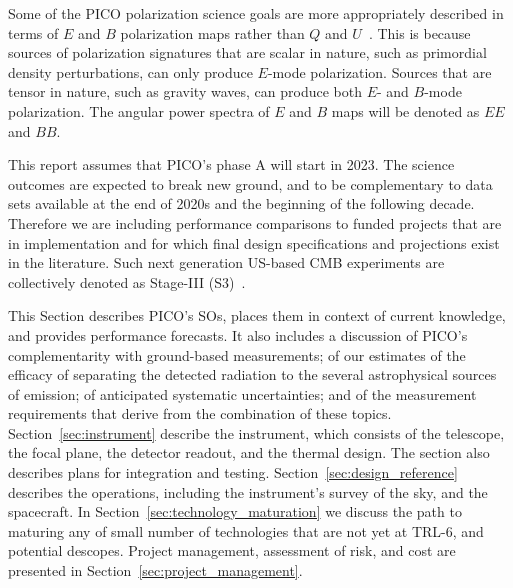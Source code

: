 \documentclass[PICOReport.tex]{subfiles}
\begin{document}

Some of the PICO polarization science goals are more appropriately described in terms of $E$ and $B$ polarization maps rather than $Q$ and $U$~\cite{eb_decomposition}. This is because sources of polarization signatures that are scalar in nature, such as primordial density perturbations, can only produce $E$-mode polarization. Sources that are tensor in nature, such as gravity waves, can produce both $E$- and $B$-mode polarization. The angular power spectra of $E$ and $B$ maps will be denoted as $EE$ and $BB$.

This report assumes that PICO's phase A will start in 2023. The science outcomes are expected to break new ground, and to be complementary to data sets available at the end of 2020s and the beginning of the following decade. Therefore we are including performance comparisons to funded projects that are in implementation and for which final design specifications and projections exist in the literature. Such next generation US-based CMB experiments are collectively denoted as Stage-III (S3)~\citep{advancedact,spt3g,so,class,bicepkeck,spider,piper}. 

This Section describes PICO's \ac{SOs}, places them in context of current knowledge, and provides performance forecasts. It also includes a discussion of PICO's complementarity with ground-based measurements; of our estimates of the efficacy of separating the detected radiation to the several astrophysical sources of emission; of anticipated systematic uncertainties; and of the measurement requirements that derive from the combination of these topics.  Section~\ref{sec:instrument} describe the instrument, which consists of the telescope, the focal plane, the detector readout, and the thermal design. The section also describes plans for integration and testing. Section~\ref{sec:design_reference} describes the operations, including the instrument's survey of the sky, and the spacecraft. In Section~\ref{sec:technology_maturation} we discuss the path to maturing any of small number of technologies that are not yet at TRL-6, and potential descopes. Project management, assessment of risk, and cost are presented in Section~\ref{sec:project_management}. 


\end{document}
